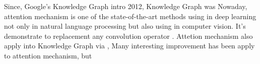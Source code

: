 Since, Google's Knowledge Graph intro 2012, Knowledge Graph was 
Nowaday, attention mechanism is one of the state-of-the-art methods using in deep learning not only in natural language processing but also using in computer vision.
It's demonstrate to replacement any convolution operator \cite{cordonnier2020multi}. Attetion mechanism also apply into Knowledge Graph via \cite{velivckovic2017graph}, 
Many interesting improvement has been apply to attention mechanism, but 